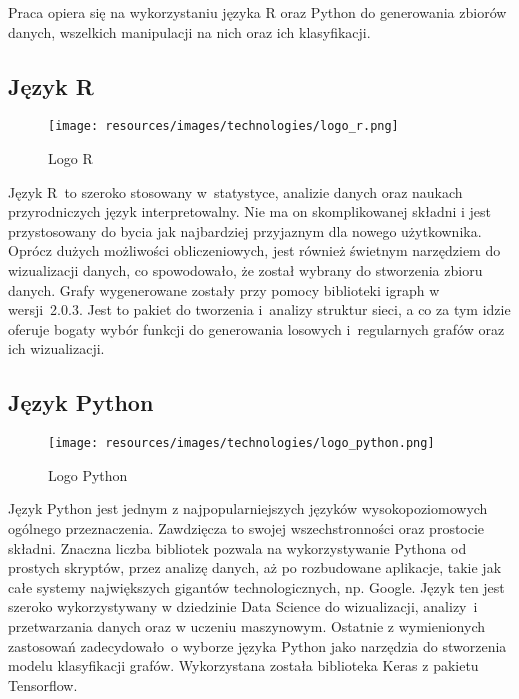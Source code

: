 Praca opiera się na wykorzystaniu języka R oraz Python do generowania zbiorów danych,
wszelkich manipulacji na nich oraz ich klasyfikacji.

\subsection{Język R}

\begin{figure}[ht]
	\centering
	\texttt{[image: resources/images/technologies/logo\_r.png]}
	\caption{Logo R \cite{strR}}
	\label{Fig:tech-r}
\end{figure}
\FloatBarrier

Język R~to szeroko stosowany w~statystyce, analizie danych oraz naukach przyrodniczych język interpretowalny.
Nie ma on skomplikowanej składni i jest przystosowany do bycia jak najbardziej przyjaznym dla nowego użytkownika.
Oprócz dużych możliwości obliczeniowych, jest również świetnym narzędziem do wizualizacji danych,
co spowodowało, że został wybrany do stworzenia zbioru danych.
Grafy wygenerowane zostały przy pomocy biblioteki igraph w wersji~2.0.3.
Jest to pakiet do tworzenia i~analizy struktur sieci, a co za tym idzie oferuje bogaty wybór funkcji do
generowania losowych i~regularnych grafów oraz ich wizualizacji.

\subsection{Język Python}

\begin{figure}[ht]
	\centering
	\texttt{[image: resources/images/technologies/logo\_python.png]}
	\caption{Logo Python \cite{strPython}}
	\label{Fig:tech-python}
\end{figure}
\FloatBarrier

Język Python jest jednym z najpopularniejszych języków wysokopoziomowych ogólnego przeznaczenia.
Zawdzięcza to swojej wszechstronności oraz prostocie składni.
Znaczna liczba bibliotek pozwala na wykorzystywanie Pythona od
prostych skryptów, przez analizę danych, aż po rozbudowane aplikacje, takie jak całe
systemy największych gigantów technologicznych, np. Google. Język ten jest szeroko
wykorzystywany w dziedzinie Data Science do wizualizacji, analizy~i przetwarzania danych oraz w uczeniu maszynowym.
Ostatnie z wymienionych zastosowań zadecydowało~o wyborze języka Python jako narzędzia do stworzenia modelu klasyfikacji grafów.
Wykorzystana została biblioteka Keras z pakietu Tensorflow.

